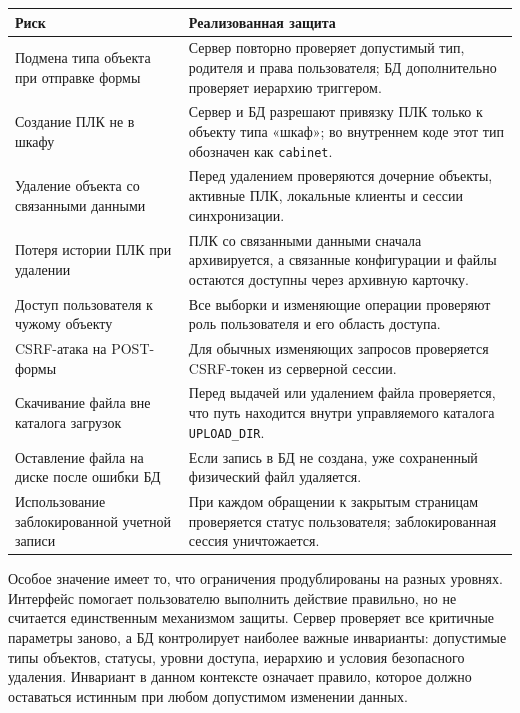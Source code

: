 \begin{center}
    \small
    \label{tab:chapter3_safety_measures}
    \begin{tabularx}{\textwidth}{|>{\raggedright\arraybackslash}p{}|>{\raggedright\arraybackslash}X|}
        \hline
        \textbf{Риск} & \textbf{Реализованная защита} \\ \hline
        Подмена типа объекта при отправке формы & Сервер повторно проверяет допустимый тип, родителя и права пользователя; БД дополнительно проверяет иерархию триггером. \\ \hline
        Создание ПЛК не в шкафу & Сервер и БД разрешают привязку ПЛК только к объекту типа «шкаф»; во внутреннем коде этот тип обозначен как \texttt{cabinet}. \\ \hline
        Удаление объекта со связанными данными & Перед удалением проверяются дочерние объекты, активные ПЛК, локальные клиенты и сессии синхронизации. \\ \hline
        Потеря истории ПЛК при удалении & ПЛК со связанными данными сначала архивируется, а связанные конфигурации и файлы остаются доступны через архивную карточку. \\ \hline
        Доступ пользователя к чужому объекту & Все выборки и изменяющие операции проверяют роль пользователя и его область доступа. \\ \hline
        CSRF-атака на POST-формы & Для обычных изменяющих запросов проверяется CSRF-токен из серверной сессии. \\ \hline
        Скачивание файла вне каталога загрузок & Перед выдачей или удалением файла проверяется, что путь находится внутри управляемого каталога \texttt{UPLOAD\_DIR}. \\ \hline
        Оставление файла на диске после ошибки БД & Если запись в БД не создана, уже сохраненный физический файл удаляется. \\ \hline
        Использование заблокированной учетной записи & При каждом обращении к закрытым страницам проверяется статус пользователя; заблокированная сессия уничтожается. \\ \hline
    \end{tabularx}
    \normalsize
\end{center}

Особое значение имеет то, что ограничения продублированы на разных уровнях. Интерфейс помогает пользователю выполнить действие правильно, но не считается единственным механизмом защиты. Сервер проверяет все критичные параметры заново, а БД контролирует наиболее важные инварианты: допустимые типы объектов, статусы, уровни доступа, иерархию и условия безопасного удаления. Инвариант в данном контексте означает правило, которое должно оставаться истинным при любом допустимом изменении данных.

